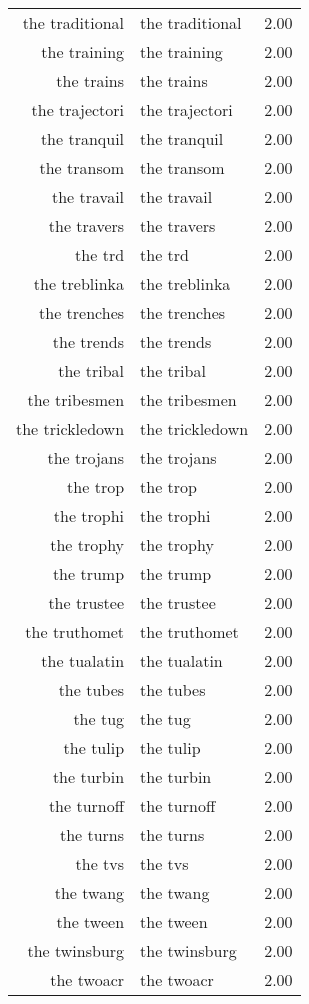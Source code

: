 \begin{table}[ht]
\begin{tabular}{rlr}
  the traditional & the traditional & 2.00 \\ 
  the training & the training & 2.00 \\ 
  the trains & the trains & 2.00 \\ 
  the trajectori & the trajectori & 2.00 \\ 
  the tranquil & the tranquil & 2.00 \\ 
  the transom & the transom & 2.00 \\ 
  the travail & the travail & 2.00 \\ 
  the travers & the travers & 2.00 \\ 
  the trd & the trd & 2.00 \\ 
  the treblinka & the treblinka & 2.00 \\ 
  the trenches & the trenches & 2.00 \\ 
  the trends & the trends & 2.00 \\ 
  the tribal & the tribal & 2.00 \\ 
  the tribesmen & the tribesmen & 2.00 \\ 
  the trickledown & the trickledown & 2.00 \\ 
  the trojans & the trojans & 2.00 \\ 
  the trop & the trop & 2.00 \\ 
  the trophi & the trophi & 2.00 \\ 
  the trophy & the trophy & 2.00 \\ 
  the trump & the trump & 2.00 \\ 
  the trustee & the trustee & 2.00 \\ 
  the truthomet & the truthomet & 2.00 \\ 
  the tualatin & the tualatin & 2.00 \\ 
  the tubes & the tubes & 2.00 \\ 
  the tug & the tug & 2.00 \\ 
  the tulip & the tulip & 2.00 \\ 
  the turbin & the turbin & 2.00 \\ 
  the turnoff & the turnoff & 2.00 \\ 
  the turns & the turns & 2.00 \\ 
  the tvs & the tvs & 2.00 \\ 
  the twang & the twang & 2.00 \\ 
  the tween & the tween & 2.00 \\ 
  the twinsburg & the twinsburg & 2.00 \\ 
  the twoacr & the twoacr & 2.00 \\ 

\end{tabular}
\end{table}

